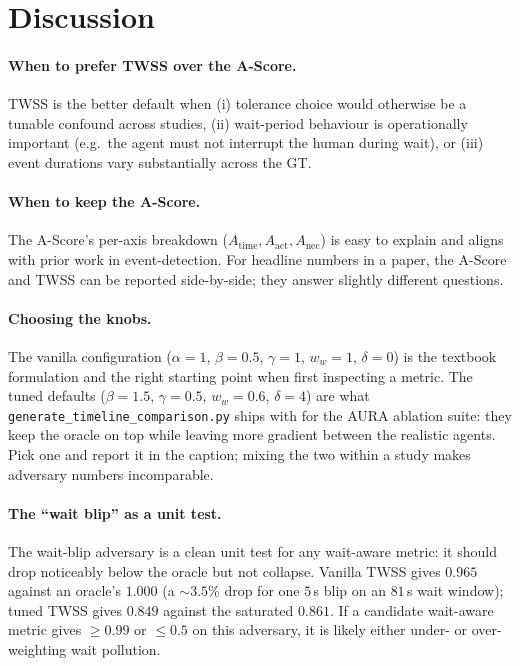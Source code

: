 \documentclass[11pt]{article}
\begin{document}
\section{Discussion}
\label{sec:discussion}

\paragraph{When to prefer TWSS over the A-Score.}
TWSS is the better default when (i) tolerance choice would otherwise
be a tunable confound across studies, (ii) wait-period behaviour is
operationally important (e.g.\ the agent must not interrupt the
human during wait), or (iii) event durations vary substantially
across the GT.

\paragraph{When to keep the A-Score.}
The A-Score's per-axis breakdown ($A_{\text{time}}, A_{\text{act}},
A_{\text{nec}}$) is easy to explain and aligns with prior work in
event-detection. For headline numbers in a paper, the A-Score and
TWSS can be reported side-by-side; they answer slightly different
questions.

\paragraph{Choosing the knobs.}
The vanilla configuration ($\alpha{=}1$, $\beta{=}0.5$, $\gamma{=}1$,
$w_w{=}1$, $\delta{=}0$) is the textbook formulation and the right
starting point when first inspecting a metric. The tuned defaults
($\beta{=}1.5$, $\gamma{=}0.5$, $w_w{=}0.6$, $\delta{=}4$) are what
\texttt{generate\_timeline\_comparison.py} ships with for the AURA
ablation suite: they keep the oracle on top while leaving more
gradient between the realistic agents. Pick one and report it in the
caption; mixing the two within a study makes adversary numbers
incomparable.

\paragraph{The ``wait blip'' as a unit test.}
The wait-blip adversary is a clean unit test for any wait-aware
metric: it should drop noticeably below the oracle but not collapse.
Vanilla TWSS gives $0.965$ against an oracle's $1.000$ (a $\sim 3.5$\%
drop for one $5$\,s blip on an $81$\,s wait window); tuned TWSS gives
$0.849$ against the saturated $0.861$. If a candidate wait-aware
metric gives $\geq 0.99$ or $\leq 0.5$ on this adversary, it is
likely either under- or over-weighting wait pollution.
\end{document}
